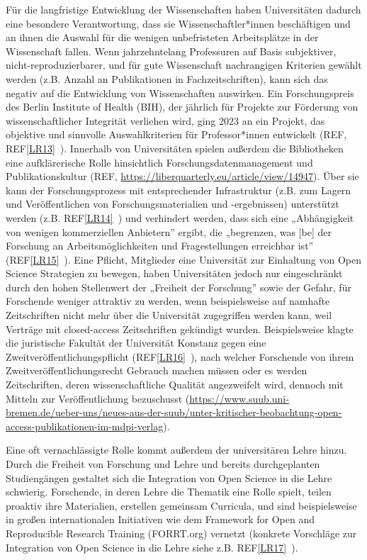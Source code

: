 \documentclass[
  letterpaper,
  DIV=11,
  numbers=noendperiod]{scrreprt}
\begin{document}
Für die langfristige Entwicklung der Wissenschaften haben Universitäten
dadurch eine besondere Verantwortung, dass sie Wissenschaftler*innen
beschäftigen und an ihnen die Auswahl für die wenigen unbefristeten
Arbeitsplätze in der Wissenschaft fallen. Wenn jahrzehntelang
Professuren auf Basis subjektiver, nicht-reproduzierbarer, und für gute
Wissenschaft nachrangigen Kriterien gewählt werden (z.B. Anzahl an
Publikationen in Fachzeitschriften), kann sich das negativ auf die
Entwicklung von Wissenschaften auswirken. Ein Forschungspreis des Berlin
Institute of Health (BIH), der jährlich für Projekte zur Förderung von
wissenschaftlicher Integrität verliehen wird, ging 2023 an ein Projekt,
das objektive und sinnvolle Auswahlkriterien für Professor*innen
entwickelt (REF, REF\hyperref[_msocom_13]{{[}LR13{]}}~). Innerhalb von
Universitäten spielen außerdem die Bibliotheken eine aufklärerische
Rolle hinsichtlich Forschungsdatenmanagement und Publikationskultur
(REF, \url{https://liberquarterly.eu/article/view/14947}). Über sie kann
der Forschungsprozess mit entsprechender Infrastruktur (z.B. zum Lagern
und Veröffentlichen von Forschungsmaterialien und -ergebnissen)
unterstützt werden (z.B. REF\hyperref[_msocom_14]{{[}LR14{]}}~) und
verhindert werden, dass sich eine „Abhängigkeit von wenigen
kommerziellen Anbietern'' ergibt, die „begrenzen, was {[}be{]} der
Forschung an Arbeitsmöglichkeiten und Fragestellungen erreichbar ist''
(REF\hyperref[_msocom_15]{{[}LR15{]}}~). Eine Pflicht, Mitglieder eine
Universität zur Einhaltung von Open Science Strategien zu bewegen, haben
Universitäten jedoch nur eingeschränkt durch den hohen Stellenwert der
„Freiheit der Forschung'' sowie der Gefahr, für Forschende weniger
attraktiv zu werden, wenn beispielsweise auf namhafte Zeitschriften
nicht mehr über die Universität zugegriffen werden kann, weil Verträge
mit closed-access Zeitschriften gekündigt wurden. Beispielsweise klagte
die juristische Fakultät der Universität Konstanz gegen eine
Zweitveröffentlichungspflicht (REF\hyperref[_msocom_16]{{[}LR16{]}}~),
nach welcher Forschende von ihrem Zweitveröffentlichungsrecht Gebrauch
machen müssen oder es werden Zeitschriften, deren wissenschaftliche
Qualität angezweifelt wird, dennoch mit Mitteln zur Veröffentlichung
bezuschusst
(\url{https://www.suub.uni-bremen.de/ueber-uns/neues-aus-der-suub/unter-kritischer-beobachtung-open-access-publikationen-im-mdpi-verlag}).

Eine oft vernachlässigte Rolle kommt außerdem der universitären Lehre
hinzu. Durch die Freiheit von Forschung und Lehre und bereits
durchgeplanten Studiengängen gestaltet sich die Integration von Open
Science in die Lehre schwierig. Forschende, in deren Lehre die Thematik
eine Rolle spielt, teilen proaktiv ihre Materialien, erstellen gemeinsam
Curricula, und sind beispielsweise in großen internationalen Initiativen
wie dem Framework for Open and Reproducible Research Training
(FORRT.org) vernetzt (konkrete Vorschläge zur Integration von Open
Science in die Lehre siehe z.B. REF\hyperref[_msocom_17]{{[}LR17{]}}~).
\end{document}
